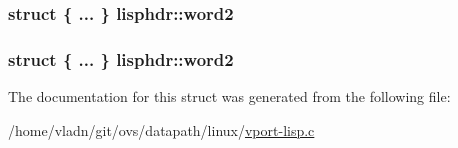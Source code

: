 \subsubsection[{word2}]{\setlength{\rightskip}{0pt plus 5cm}struct \{ ... \}   lisphdr\+::word2}\label{structlisphdr_a5a4d067fadb40535e26b1a0305f46db0}
\hypertarget{structlisphdr_a5d95c036f590f2cb6dae970e5b2eba15}{}
\subsubsection[{word2}]{\setlength{\rightskip}{0pt plus 5cm}struct \{ ... \}   lisphdr\+::word2}\label{structlisphdr_a5d95c036f590f2cb6dae970e5b2eba15}


The documentation for this struct was generated from the following file\+:\begin{DoxyCompactItemize}
\item 
/home/vladn/git/ovs/datapath/linux/\hyperlink{linux_2vport-lisp_8c}{vport-\/lisp.\+c}\end{DoxyCompactItemize}
